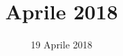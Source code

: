 


\title{ Aprile 2018}
\author{\GroupName}

\date{19 Aprile 2018}



\frenchspacing

\makeFrontPage



